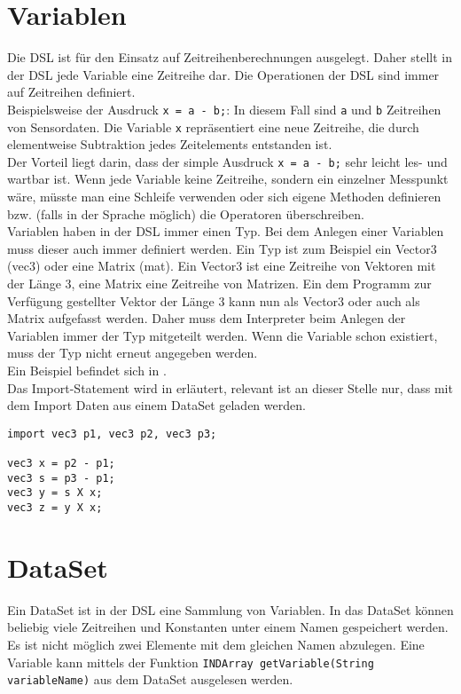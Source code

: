 \section{Variablen}
Die \ac{DSL} ist für den Einsatz auf Zeitreihenberechnungen ausgelegt.
Daher stellt in der \ac{DSL} jede Variable eine Zeitreihe dar.
Die Operationen der \ac{DSL} sind immer auf Zeitreihen definiert.\\
Beispielsweise der Ausdruck \texttt{x = a - b;}:
In diesem Fall sind \texttt{a} und \texttt{b} Zeitreihen von Sensordaten.
Die Variable \texttt{x} repräsentiert eine neue Zeitreihe, die durch elementweise Subtraktion jedes Zeitelements entstanden ist.\\
Der Vorteil liegt darin, dass der simple Ausdruck \texttt{x = a - b;} sehr leicht les- und wartbar ist.
Wenn jede Variable keine Zeitreihe, sondern ein einzelner Messpunkt wäre, müsste man eine Schleife verwenden oder sich eigene Methoden definieren bzw. (falls in der Sprache möglich) die Operatoren überschreiben.\\
Variablen haben in der \ac{DSL} immer einen Typ.
Bei dem Anlegen einer Variablen muss dieser auch immer definiert werden.
Ein Typ ist zum Beispiel ein Vector3 (vec3) oder eine Matrix (mat).
Ein Vector3 ist eine Zeitreihe von Vektoren mit der Länge 3, eine Matrix eine Zeitreihe von Matrizen.
Ein dem Programm zur Verfügung gestellter Vektor der Länge 3 kann nun als Vector3 oder auch als Matrix aufgefasst werden.
Daher muss dem Interpreter beim Anlegen der Variablen immer der Typ mitgeteilt werden.
Wenn die Variable schon existiert, muss der Typ nicht erneut angegeben werden.\\
Ein Beispiel befindet sich in .\\
Das Import-Statement wird in  erläutert, relevant ist an dieser Stelle nur, dass mit dem Import Daten aus einem DataSet geladen werden.

\begin{lstlisting}[language=prepro, label={lst:Bsp_Variablenzuweisung}, caption={Beispiel Variablenzuweisung}, captionpos=b]
import vec3 p1, vec3 p2, vec3 p3;

vec3 x = p2 - p1;
vec3 s = p3 - p1;
vec3 y = s X x;
vec3 z = y X x;
\end{lstlisting}

\section{DataSet}
Ein DataSet ist in der \ac{DSL} eine Sammlung von Variablen.
In das DataSet können beliebig viele Zeitreihen und Konstanten unter einem Namen gespeichert werden.
Es ist nicht möglich zwei Elemente mit dem gleichen Namen abzulegen.
Eine Variable kann mittels der Funktion \texttt{INDArray getVariable(String variableName)} aus dem DataSet ausgelesen werden.

